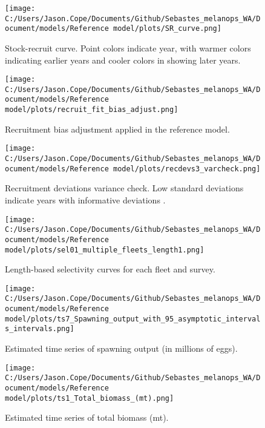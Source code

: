 \documentclass[11pt,
  english,
  letterpaper,
]{article}
\begin{document}
\begin{figure}
\centering
\texttt{[image: C:/Users/Jason.Cope/Documents/Github/Sebastes\_melanops\_WA/Document/models/Reference model/plots/SR\_curve.png]}
\caption{Stock-recruit curve. Point colors indicate year, with warmer colors indicating earlier years and cooler colors in showing later years.\label{fig:bh-curve}}
\end{figure}

\begin{figure}
\centering
\texttt{[image: C:/Users/Jason.Cope/Documents/Github/Sebastes\_melanops\_WA/Document/models/Reference model/plots/recruit\_fit\_bias\_adjust.png]}
\caption{Recruitment bias adjustment applied in the reference model.\label{fig:bias-adj}}
\end{figure}

\begin{figure}
\centering
\texttt{[image: C:/Users/Jason.Cope/Documents/Github/Sebastes\_melanops\_WA/Document/models/Reference model/plots/recdevs3\_varcheck.png]}
\caption{Recruitment deviations variance check. Low standard deviations indicate years with informative deviations .\label{fig:varcheck}}
\end{figure}

\begin{figure}
\centering
\texttt{[image: C:/Users/Jason.Cope/Documents/Github/Sebastes\_melanops\_WA/Document/models/Reference model/plots/sel01\_multiple\_fleets\_length1.png]}
\caption{Length-based selectivity curves for each fleet and survey.\label{fig:fleet_selectivity}}
\end{figure}

\begin{figure}
\centering
\texttt{[image: C:/Users/Jason.Cope/Documents/Github/Sebastes\_melanops\_WA/Document/models/Reference model/plots/ts7\_Spawning\_output\_with\_95\_asymptotic\_intervals\_intervals.png]}
\caption{Estimated time series of spawning output (in millions of eggs).\label{fig:ssb}}
\end{figure}

\begin{figure}
\centering
\texttt{[image: C:/Users/Jason.Cope/Documents/Github/Sebastes\_melanops\_WA/Document/models/Reference model/plots/ts1\_Total\_biomass\_(mt).png]}
\caption{Estimated time series of total biomass (mt).\label{fig:tot-bio}}
\end{figure}
\end{document}
